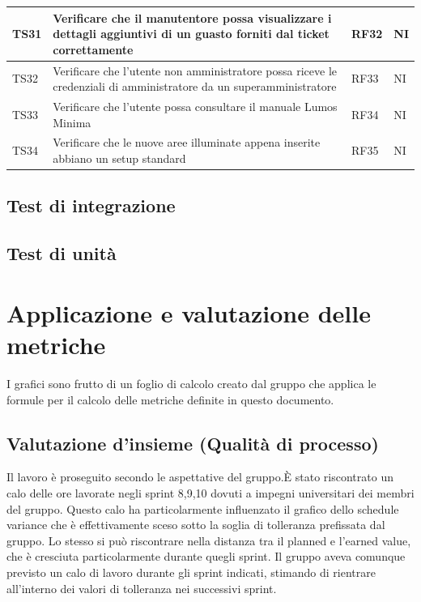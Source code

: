 \documentclass[12pt]{article}
\begin{document}
\begin{xltabular}{\linewidth}{|>{\hsize}X|>{\hsize}X|>{\hsize}X|>{\hsize}X|}
	\hline
	TS31	 & Verificare che il manutentore possa visualizzare i dettagli aggiuntivi di un guasto forniti dal ticket correttamente	&	RF32	&	NI	\\
	\hline
	TS32	 & Verificare che l'utente non amministratore possa riceve le credenziali di amministratore da un superamministratore	&	RF33	&	NI	\\
	\hline
	TS33	 & Verificare che l'utente possa consultare il manuale Lumos Minima	&	RF34	&	NI	\\
	\hline
	TS34	 & Verificare che le nuove aree illuminate appena inserite abbiano un setup standard	&	RF35	&	NI	\\

\end{xltabular}

\subsection{Test di integrazione}

\subsection{Test di unità}

\section {Applicazione e valutazione delle metriche}
I grafici sono frutto di un foglio di calcolo creato dal gruppo che applica le formule per il calcolo delle metriche definite in questo documento.

\subsection{Valutazione d’insieme (Qualità di processo)}
Il lavoro è proseguito secondo le aspettative del gruppo.È stato riscontrato un calo delle ore lavorate negli sprint 8,9,10 dovuti a impegni universitari dei membri del gruppo. Questo calo ha particolarmente influenzato il grafico dello schedule variance che è effettivamente sceso sotto la soglia di tolleranza prefissata dal gruppo. Lo stesso si può riscontrare nella distanza tra il planned e l’earned value, che è cresciuta particolarmente durante quegli sprint. Il gruppo aveva comunque previsto un calo di lavoro durante gli sprint indicati, stimando di rientrare all’interno dei valori di tolleranza nei successivi sprint.
\end{document}
